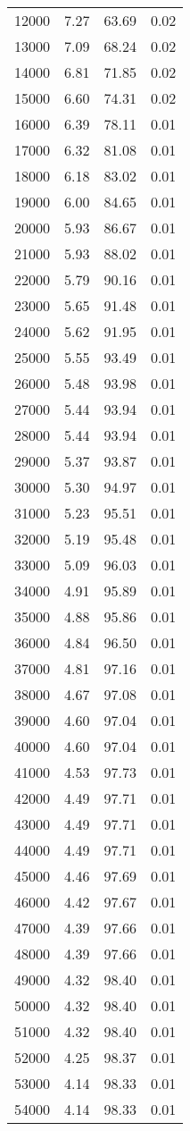 \begin{table}[ht]
\begin{tabular}{rrrr}
  12000 & 7.27 & 63.69 & 0.02 \\ 
  13000 & 7.09 & 68.24 & 0.02 \\ 
  14000 & 6.81 & 71.85 & 0.02 \\ 
  15000 & 6.60 & 74.31 & 0.02 \\ 
  16000 & 6.39 & 78.11 & 0.01 \\ 
  17000 & 6.32 & 81.08 & 0.01 \\ 
  18000 & 6.18 & 83.02 & 0.01 \\ 
  19000 & 6.00 & 84.65 & 0.01 \\ 
  20000 & 5.93 & 86.67 & 0.01 \\ 
  21000 & 5.93 & 88.02 & 0.01 \\ 
  22000 & 5.79 & 90.16 & 0.01 \\ 
  23000 & 5.65 & 91.48 & 0.01 \\ 
  24000 & 5.62 & 91.95 & 0.01 \\ 
  25000 & 5.55 & 93.49 & 0.01 \\ 
  26000 & 5.48 & 93.98 & 0.01 \\ 
  27000 & 5.44 & 93.94 & 0.01 \\ 
  28000 & 5.44 & 93.94 & 0.01 \\ 
  29000 & 5.37 & 93.87 & 0.01 \\ 
  30000 & 5.30 & 94.97 & 0.01 \\ 
  31000 & 5.23 & 95.51 & 0.01 \\ 
  32000 & 5.19 & 95.48 & 0.01 \\ 
  33000 & 5.09 & 96.03 & 0.01 \\ 
  34000 & 4.91 & 95.89 & 0.01 \\ 
  35000 & 4.88 & 95.86 & 0.01 \\ 
  36000 & 4.84 & 96.50 & 0.01 \\ 
  37000 & 4.81 & 97.16 & 0.01 \\ 
  38000 & 4.67 & 97.08 & 0.01 \\ 
  39000 & 4.60 & 97.04 & 0.01 \\ 
  40000 & 4.60 & 97.04 & 0.01 \\ 
  41000 & 4.53 & 97.73 & 0.01 \\ 
  42000 & 4.49 & 97.71 & 0.01 \\ 
  43000 & 4.49 & 97.71 & 0.01 \\ 
  44000 & 4.49 & 97.71 & 0.01 \\ 
  45000 & 4.46 & 97.69 & 0.01 \\ 
  46000 & 4.42 & 97.67 & 0.01 \\ 
  47000 & 4.39 & 97.66 & 0.01 \\ 
  48000 & 4.39 & 97.66 & 0.01 \\ 
  49000 & 4.32 & 98.40 & 0.01 \\ 
  50000 & 4.32 & 98.40 & 0.01 \\ 
  51000 & 4.32 & 98.40 & 0.01 \\ 
  52000 & 4.25 & 98.37 & 0.01 \\ 
  53000 & 4.14 & 98.33 & 0.01 \\ 
  54000 & 4.14 & 98.33 & 0.01 \\ 
   \hline
\end{tabular}
\end{table}
